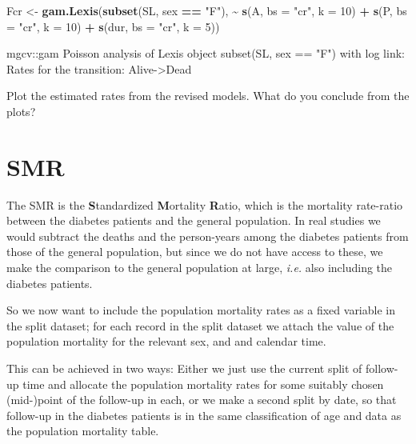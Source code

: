 \documentclass[
]{book}
\newenvironment{Shaded}{\begin{snugshade}}{\end{snugshade}}
\newcommand{\AttributeTok}[1]{\textcolor[rgb]{0.13,0.29,0.53}{#1}}
\newcommand{\DecValTok}[1]{\textcolor[rgb]{0.00,0.00,0.81}{#1}}
\newcommand{\FunctionTok}[1]{\textcolor[rgb]{0.13,0.29,0.53}{\textbf{#1}}}
\newcommand{\NormalTok}[1]{#1}
\newcommand{\OtherTok}[1]{\textcolor[rgb]{0.56,0.35,0.01}{#1}}
\newcommand{\SpecialCharTok}[1]{\textcolor[rgb]{0.81,0.36,0.00}{\textbf{#1}}}
\newcommand{\StringTok}[1]{\textcolor[rgb]{0.31,0.60,0.02}{#1}}
\begin{document}
\begin{enumerate}
\begin{Shaded}
\begin{Highlighting}[]
\NormalTok{Fcr }\OtherTok{\textless{}{-}} \FunctionTok{gam.Lexis}\NormalTok{(}\FunctionTok{subset}\NormalTok{(SL, sex }\SpecialCharTok{==} \StringTok{"F"}\NormalTok{),}
                 \SpecialCharTok{\textasciitilde{}} \FunctionTok{s}\NormalTok{(A, }\AttributeTok{bs =} \StringTok{"cr"}\NormalTok{, }\AttributeTok{k =} \DecValTok{10}\NormalTok{) }\SpecialCharTok{+}
                   \FunctionTok{s}\NormalTok{(P, }\AttributeTok{bs =} \StringTok{"cr"}\NormalTok{, }\AttributeTok{k =} \DecValTok{10}\NormalTok{) }\SpecialCharTok{+}
                 \FunctionTok{s}\NormalTok{(dur, }\AttributeTok{bs =} \StringTok{"cr"}\NormalTok{, }\AttributeTok{k =} \DecValTok{5}\NormalTok{))}
\end{Highlighting}
\end{Shaded}

\begin{Shaded}
\begin{Highlighting}[]
\NormalTok{mgcv::gam Poisson analysis of Lexis object subset(SL, sex == "F") with log link:}
\NormalTok{Rates for the transition:}
\NormalTok{Alive{-}\textgreater{}Dead}
\end{Highlighting}
\end{Shaded}

  Plot the estimated rates from the revised models.
  What do you conclude from the plots?
\end{enumerate}

\section{SMR}\label{smr}

The SMR is the \textbf{S}tandardized \textbf{M}ortality
\textbf{R}atio, which is the mortality rate-ratio between the diabetes
patients and the general population. In real studies we would
subtract the deaths and the person-years among the diabetes patients
from those of the general population, but since we do not have access
to these, we make the comparison to the general population at large,
\emph{i.e.} also including the diabetes patients.

So we now want to include the population mortality rates as a fixed
variable in the split dataset; for each record in the split dataset we
attach the value of the population mortality for the relevant sex, and
and calendar time.

This can be achieved in two ways: Either we just use the current split
of follow-up time and allocate the population mortality rates for some
suitably chosen (mid-)point of the follow-up in each, or we make a
second split by date, so that follow-up in the diabetes patients is in
the same classification of age and data as the population mortality
table.
\end{document}
